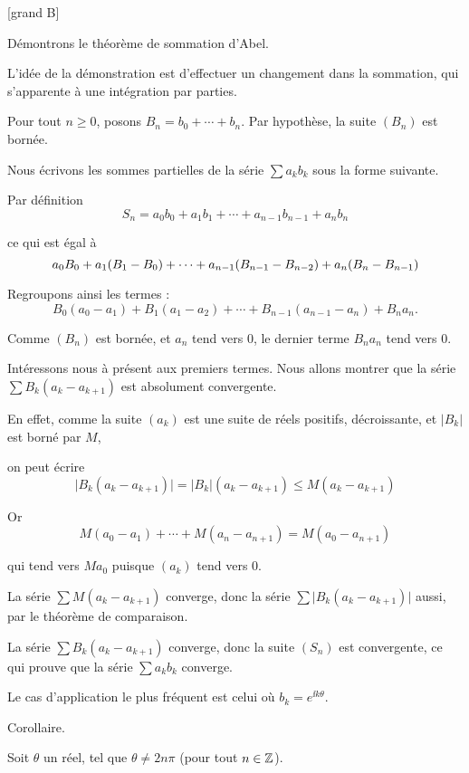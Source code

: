 [grand B]

Démontrons le théorème de sommation d'Abel.

L'idée de la démonstration est d'effectuer un changement dans la
sommation, qui s'apparente à une intégration par parties. 

\change
Pour tout $n\ge0$, posons $B_n=b_0+\cdots+b_n$. Par hypothèse, la suite
$(B_n)$ est bornée. 

\change
Nous écrivons les sommes partielles de la série $\sum a_k b_k$ sous la forme suivante.

Par définition
$$
S_n = a_0b_0+a_1b_1+\cdots+a_{n-1}b_{n-1}+a_nb_n
$$

\change
ce qui est égal à 
$$
 a_0B_0+a_1(B_1-B_0)+\cdots +a_{n-1}(B_{n-1}-B_{n-2}) + a_n(B_n-B_{n-1})\\
$$

\change
Regroupons ainsi les termes :
$$
B_0(a_0-a_1)+B_1(a_1-a_2)+\cdots+B_{n-1}(a_{n-1}-a_n)+B_na_n .
$$

\change
Comme $(B_n)$ est bornée, et $a_n$ tend vers $0$, le dernier terme $B_na_n$
tend vers $0$. 

\change
Intéressons nous à présent aux premiers termes. Nous allons montrer que la série $\sum B_k(a_k-a_{k+1})$ est absolument convergente. 

\change
En effet, comme  la suite $(a_k)$ est une suite de réels positifs,
décroissante, et $|B_k|$ est borné par $M$, 

\change
on peut écrire
$$
\big|B_k(a_k-a_{k+1})\big| = \big|B_k\big|(a_k-a_{k+1})\le M(a_k-a_{k+1})
$$

\change
Or
$$
M(a_0-a_1)+\cdots+M(a_n-a_{n+1}) = M(a_0-a_{n+1})
$$

\change
qui tend vers $Ma_0$ puisque $(a_k)$ tend vers $0$.

\change
La série $\sum M(a_k-a_{k+1})$ converge, donc la série
$\sum\big|B_k(a_k-a_{k+1})\big|$ aussi, par le théorème de comparaison. 

\change
La série $\sum B_k(a_k-a_{k+1})$ converge, donc la suite $(S_n)$ est convergente, ce qui prouve que la série $\sum a_k b_k$ converge.

\diapo

Le cas d'application le plus fréquent est celui où
$b_k=e^{\ii k\theta}$.

\change
Corollaire.

Soit $\theta$ un réel, tel que $\theta \neq 2n\pi$ (pour tout $n \in\mathbb{Z}$). 

